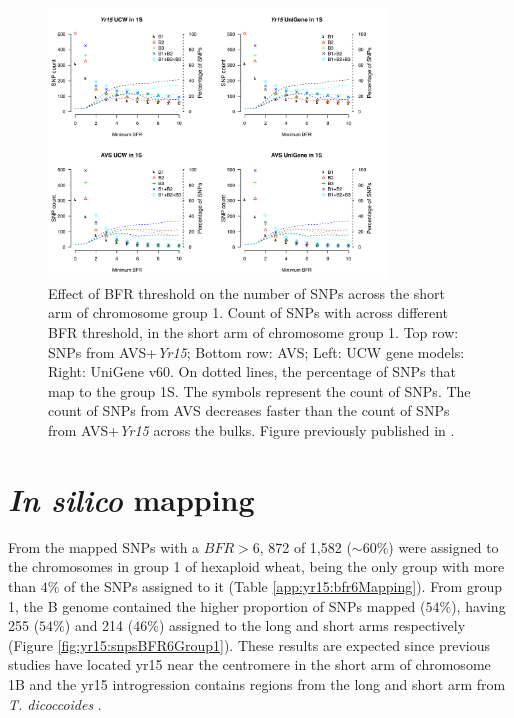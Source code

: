 \begin{figure}
\centering
\includegraphics[width=0.8\textwidth]{Yr15/Figures/bfrChanges.pdf}
\caption[Effect of BFR threshold on the number of SNPs]{Effect of BFR threshold on the number of SNPs across the short arm of chromosome group 1. Count of SNPs with across different BFR threshold, in the short arm of chromosome group 1.  Top row: SNPs from AVS+\textit{Yr15}; Bottom row: AVS; Left: UCW gene models: Right: UniGene v60. On dotted lines, the percentage of SNPs that map to the group 1S. The symbols represent the count of SNPs. The count of SNPs from AVS decreases faster than the count of SNPs from AVS+\textit{Yr15} across the bulks.  Figure previously published in \citet{Ramirez-Gonzalez2015b}. }
\label{fig:yr15:bfrChange}
\end{figure}

\section{\textit{In silico} mapping}
\label{sub:yr15:inSilico}
From the mapped SNPs with a $BFR>6$, 872 of 1,582 ($\sim60\%$) were assigned to the chromosomes in group 1 of hexaploid wheat, being the only group with more than $4\%$ of the SNPs assigned to it (Table \ref{app:yr15:bfr6Mapping}). 
From group 1, the B genome contained the higher proportion of SNPs mapped ($54\%$), having 255 ($54\%$) and 214 ($46\%$) assigned to the long and short arms respectively (Figure \ref{fig:yr15:snpsBFR6Group1}).  
These results are expected since previous studies have located \acrshort{yr15} near the centromere in the short arm of chromosome 1B and the \acrshort{yr15} introgression contains regions from the long and short arm from \textit{T. dicoccoides} \citep{Murphy2009,Peng2000,Grama1997}. 

